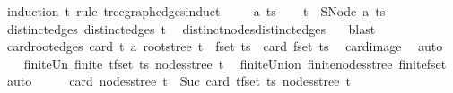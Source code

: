 \begin{isabellebody}
%
\isadelimproof
%
\endisadelimproof
%
\isatagproof
{}\isamarkupfalse%
\ {\isacharparenleft}{\kern0pt}induction\ t\ rule{\isacharcolon}{\kern0pt}\ tree{\isacharunderscore}{\kern0pt}graph{\isacharunderscore}{\kern0pt}edges{\isachardot}{\kern0pt}induct{\isacharparenright}{\kern0pt}\isanewline
\ \ \isamarkupfalse%
\ {\isacharparenleft}{\kern0pt}{}\ a\ ts{\isacharparenright}{\kern0pt}\isanewline
\ \ \isamarkupfalse%
\ {\isacharquery}{\kern0pt}t\ {\isacharequal}{\kern0pt}\ {\isachardoublequoteopen}SNode\ a\ ts{\isachardoublequoteclose}\isanewline
\ \ \isamarkupfalse%
\ distinct{\isacharunderscore}{\kern0pt}edges{\isacharcolon}{\kern0pt}\ {\isachardoublequoteopen}distinct{\isacharunderscore}{\kern0pt}edges\ {\isacharquery}{\kern0pt}t{\isachardoublequoteclose}\ \isamarkupfalse%
\ distinct{\isacharunderscore}{\kern0pt}nodes{\isacharunderscore}{\kern0pt}distinct{\isacharunderscore}{\kern0pt}edges\ {}{\isacharparenleft}{\kern0pt}{}{\isacharparenright}{\kern0pt}\ \isamarkupfalse%
\ blast\isanewline
\ \ \isamarkupfalse%
\ \isamarkupfalse%
\ card{\isacharunderscore}{\kern0pt}root{\isacharunderscore}{\kern0pt}edges{\isacharcolon}{\kern0pt}\ {\isachardoublequoteopen}card\ {\isacharparenleft}{\kern0pt}{\isacharparenleft}{\kern0pt}{\isasymlambda}t{\isachardot}{\kern0pt}\ {\isacharbraceleft}{\kern0pt}a{\isacharcomma}{\kern0pt}\ root{\isacharunderscore}{\kern0pt}stree\ t{\isacharbraceright}{\kern0pt}{\isacharparenright}{\kern0pt}\ {\isacharbackquote}{\kern0pt}\ fset\ ts{\isacharparenright}{\kern0pt}\ {\isacharequal}{\kern0pt}\ card\ {\isacharparenleft}{\kern0pt}fset\ ts{\isacharparenright}{\kern0pt}{\isachardoublequoteclose}\ \isamarkupfalse%
\ card{\isacharunderscore}{\kern0pt}image\ \isamarkupfalse%
\ auto\isanewline
\ \ \isamarkupfalse%
\ finite{\isacharunderscore}{\kern0pt}Un{\isacharcolon}{\kern0pt}\ {\isachardoublequoteopen}finite\ {\isacharparenleft}{\kern0pt}{\isasymUnion}t{\isasymin}fset\ ts{\isachardot}{\kern0pt}\ nodes{\isacharunderscore}{\kern0pt}stree\ t{\isacharparenright}{\kern0pt}{\isachardoublequoteclose}\ \isamarkupfalse%
\ finite{\isacharunderscore}{\kern0pt}Union\ finite{\isacharunderscore}{\kern0pt}nodes{\isacharunderscore}{\kern0pt}stree\ finite{\isacharunderscore}{\kern0pt}fset\ \isamarkupfalse%
\ auto\isanewline
\ \ \isamarkupfalse%
\ \isamarkupfalse%
\ {\isachardoublequoteopen}card\ {\isacharparenleft}{\kern0pt}nodes{\isacharunderscore}{\kern0pt}stree\ {\isacharquery}{\kern0pt}t{\isacharparenright}{\kern0pt}\ {\isacharequal}{\kern0pt}\ Suc\ {\isacharparenleft}{\kern0pt}card\ {\isacharparenleft}{\kern0pt}{\isasymUnion}t{\isasymin}fset\ ts{\isachardot}{\kern0pt}\ nodes{\isacharunderscore}{\kern0pt}stree\ t{\isacharparenright}{\kern0pt}{\isacharparenright}{\kern0pt}{\isachardoublequoteclose}\ \isamarkupfalse%

\end{isabellebody}

